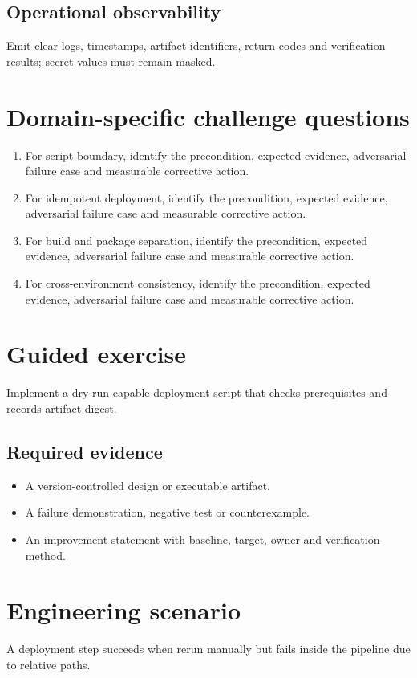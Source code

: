 \documentclass[10pt,letterpaper]{article}
\begin{document}
\subsection{Operational observability}
Emit clear logs, timestamps, artifact identifiers, return codes and verification results; secret values must remain masked.

\section{Domain-specific challenge questions}
\begin{enumerate}
\item For script boundary, identify the precondition, expected evidence, adversarial failure case and measurable corrective action.
\item For idempotent deployment, identify the precondition, expected evidence, adversarial failure case and measurable corrective action.
\item For build and package separation, identify the precondition, expected evidence, adversarial failure case and measurable corrective action.
\item For cross-environment consistency, identify the precondition, expected evidence, adversarial failure case and measurable corrective action.
\end{enumerate}
\section{Guided exercise}
Implement a dry-run-capable deployment script that checks prerequisites and records artifact digest.

\subsection{Required evidence}
\begin{itemize}
\item A version-controlled design or executable artifact.
\item A failure demonstration, negative test or counterexample.
\item An improvement statement with baseline, target, owner and verification method.
\end{itemize}


\section{Engineering scenario}
A deployment step succeeds when rerun manually but fails inside the pipeline due to relative paths.
\end{document}
